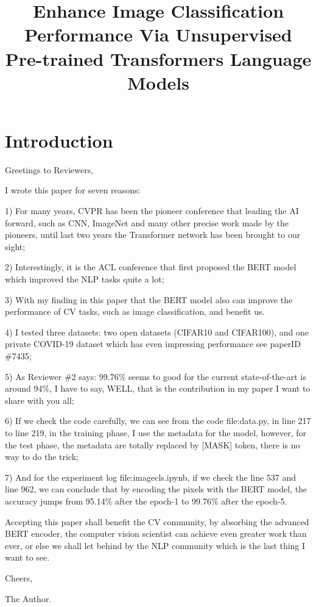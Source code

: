 \documentclass[10pt,twocolumn,letterpaper]{article}
\begin{document}
\title{Enhance Image Classification Performance Via Unsupervised Pre-trained Transformers Language Models}  %

\maketitle
\thispagestyle{empty}


\section{Introduction}


Greetings to Reviewers,

I wrote this paper for seven reasons:

1) For many years, CVPR has been the pioneer conference that leading the AI forward, such as CNN, ImageNet and many other precise work made by the pioneers, until last two years the Transformer network has been brought to our sight;

2) Interestingly, it is the ACL conference that first proposed the BERT model which improved the NLP tasks quite a lot;

3) With my finding in this paper that the BERT model also can improve the performance of CV tasks, such as image classification, and benefit us.

4) I tested three datasets: two open datasets (CIFAR10 and CIFAR100), and one private COVID-19 dataset which has even impressing performance see paperID \#7435;

5) As Reviewer \#2 says: 99.76\% seems to good for the current state-of-the-art is around 94\%, I have to say, WELL, that is the contribution in my paper I want to share with you all;

6) If we check the code carefully, we can see from the code file:data.py, in line 217 to line 219, in the training phase, I use the metadata for the model, however, for the test phase, the metadata are totally replaced by [MASK] token, there is no way to do the trick;

7) And for the experiment log file:imagecls.ipynb, if we check the line 537 and line 962, we can conclude that by encoding the pixels with the BERT model, the accuracy jumps from 95.14\% after the epoch-1 to 99.76\% after the epoch-5.

Accepting this paper shall benefit the CV community, by absorbing the advanced BERT encoder, the computer vision scientist can achieve even greater work than ever, or else we shall let behind by the NLP community which is the last thing I want to see.


Cheers,

The Author.

{\small

%
}
\end{document}
